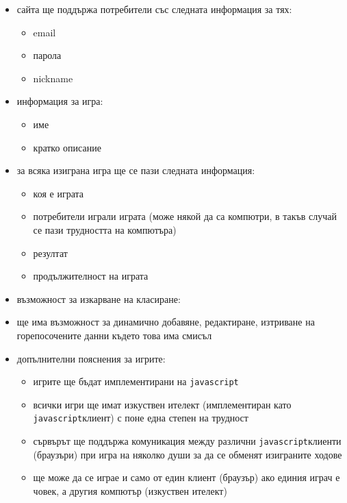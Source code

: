 \documentclass[a4paper]{article}
\def\js{\texttt{javascript}}
\begin{document}
  \begin{itemize}
    \item сайта ще поддържа потребители със следната информация за тях:
    \begin{itemize}
      \item email
      \item парола
      \item nickname
    \end{itemize}

    \item информация за игра:
    \begin{itemize}
      \item име
      \item кратко описание
    \end{itemize} 
    
    \item за всяка изиграна игра ще се пази следната информация:
    \begin{itemize}
      \item коя е играта
      \item потребители играли играта (може някой да са компютри, в такъв случай се пази трудността на компютъра)
      \item резултат
      \item продължителност на играта
    \end{itemize} 

    \item възможност за изкарване на класиране:

    \item ще има възможност за динамично добавяне, редактиране, изтриване на горепосочените данни където това има смисъл 

    \item допълнителни пояснения за игрите:
    \begin{itemize}
      \item игрите ще бъдат имплементирани на \js
      \item всички игри ще имат изкуствен ителект (имплементиран като \js клиент) с поне една степен на трудност
      \item сървърът ще поддържа комуникация между различни \js клиенти (браузъри) при игра на няколко души за да се обменят изиграните ходове
      \item ще може да се играе и само от един клиент (браузър) ако единия играч е човек, а другия компютър (изкуствен ителект)
    \end{itemize} 
  \end{itemize}
\end{document}

